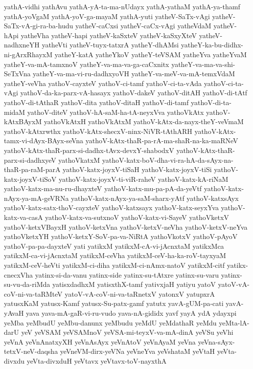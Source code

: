 {yathA-vidhi
yathAvu
yathA-yA-ta-ma-nUdayx
yathA-yathaM
yathA-ya-thamf
yathA-yoVgaM
yathA-yoV-ga-mayaM
yathA-yuti
yatheV-SaTx-vAgi
yatheV-SaTx-vA-gi-ra-ba-hudu
yatheV-caCxsi
yatheV-caCx-vAgi
yatheVdaM
yatheV-hApi
yatheVha
yatheV-hapi
yatheV-kaSxteV
yatheV-kaSxyXteV
yatheV-nadhxneYH
yatheVti
yatheV-tuyx-tatxrA
yatheY-dhAMsi
yatheY-ka-bu-didhx-ni-gArxRhayxM
yatheY-katA
yatheYkoV
yatheY-teVSAM
yatheYva
yatheYvaM
yatheY-va-mA-tamxnoV
yatheY-va-ma-va-ga-caCxnitx
yatheY-va-ma-va-shi-SeTxVna
yatheY-va-ma-vi-ru-dadhxyoVH
yatheY-va-meV-va-mA-temxVdaM
yatheY-veVha
yathoV-cayxteV
yathoV-ci-tamf
yathoV-ci-ta-vAda
yathoV-ci-ta-vAgi
yathoV-da-ka-parx-vA-hasayx
yathoV-dakeV
yathoV-ditAH
yathoV-di-tAtf
yathoV-di-tAthaR
yathoV-dita
yathoV-ditaH
yathoV-di-tamf
yathoV-di-ta-midaM
yathoV-diteV
yathoV-hA-saM-ha-tA-neyxVva
yathoVkAtx
yathoV-kAtxBAyxM
yathoVkAtxH
yathoVkAtxM
yathoV-kAtx-da-nayx-theY-veVmaM
yathoV-kAtxrwthx
yathoV-kAtx-shecxV-ninx-NiVR-tAthARH
yathoV-kAtx-tamx-vi-dAyx-BAyx-seVna
yathoV-kAtx-thaR-pa-rA-ma-shaR-na-ka-maRNeV
yathoV-kAtx-thaR-parx-si-dadhx-tAvx-devxY-shabodxV
yathoV-kAtx-thaR-parx-si-dadhxyeV
yathoVkatxM
yathoV-katx-boV-dha-vi-ra-hA-da-sAyx-na-thaR-pa-raM-parA
yathoV-katx-joyxV-tiSaH
yathoV-katx-joyxV-tiSi
yathoV-katx-joyxV-tiSoV
yathoV-katx-joyxV-ti-viR-raheV
yathoV-katx-kA-riNaM
yathoV-katx-ma-nu-ru-dhayxteV
yathoV-katx-mu-pa-pA-da-yeVtf
yathoV-katx-nAyx-ya-mA-geVRNa
yathoV-katx-nAyx-ya-saM-sharx-yAtf
yathoV-katxsAyx
yathoV-katx-satx-thoV-cayxteV
yathoV-katxsayx
yathoV-katx-seyxYva
yathoV-katx-va-casA
yathoV-katx-va-sutxnoV
yathoV-katx-vi-SayeV
yathoVketxV
yathoV-ketxVBayxH
yathoV-ketxVna
yathoV-ketxV-neVha
yathoV-ketxV-neYva
yathoVketxYH
yathoV-ketxY-SoV-pa-va-NiRtA
yathoVkotxV
yathoV-pAyoV
yathoV-pa-pa-dayxteV
yati
yatikxM
yatikxM-cA-vi-jAcnxtaM
yatikxMca
yatikxM-ca-vi-jAcnxtaM
yatikxM-ceVha
yatikxM-ceV-ha-ka-roV-tayxyaM
yatikxM-ceV-heVti
yatikxM-ci-diha
yatikxM-ci-nAmx-natoV
yatikxM-citf
yatikx-cnecxVha
yatinx-si-da-vanu
yatinx-side
yatinx-su-tAtxre
yatinx-su-varu
yatinx-su-vu-da-riMda
yatisxdadhxM
yatisxthX-tamf
yativxjaH
yatiyu
yatoV
yatoV-vA-coV-ni-va-taRMteV
yatoV-vA-coV-ni-va-taRnetxV
yatonxV
yatupxrA
yatusxKaM
yatusx-Kamf
yatusx-Su-patx-gamf
yatutx
yavA-gUM-pa-cati
yavA-yAvaH
yava
yava-mA-gaR-vi-ru-vudo
yava-nA-gididx
yavf
yayA
ydA
ydayxpi
yeMba
yeMbudU
yeMbu-danunx
yeMbudu
yeMdU
yeMdathaR
yeMdu
yeMta-lA-darU
yeV
yeVSAM
yeVSAMnoV
yeVSA-mi-teyxV-va-mA-dinA
yeVSu
yeVhi
yeVnA
yeVnAnatxyXH
yeVnAsAyx
yeVnAtoV
yeVnAyaM
yeVna
yeVna-sAyx-tetxV-neV-daqsha
yeVneVM-dirx-yeVNa
yeVneYva
yeVshataM
yeVtaH
yeVta-divxdu
yeVta-divxduH
yeVtavx
yeVtavx-toV-nayxthA
}
